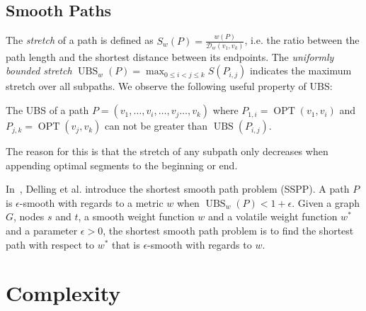 \documentclass[a4paper,UKenglish,cleveref, autoref, thm-restate]{lipics-v2021}
\newcommand*{\dist}{\mathcal{D}}
\newcommand*{\shp}{\operatorname{OPT}}
\newcommand*{\ubs}{\operatorname{UBS}}
\begin{document}
\subsection{Smooth Paths}

The \emph{stretch} of a path is defined as $S_w(P) = \frac{w(P)}{\dist_w(v_1, v_k)}$, i.e. the ratio between the path length and the shortest distance between its endpoints.
The \emph{uniformly bounded stretch} $\ubs_w(P) = \max_{0 \leq i < j \leq k}S(P_{i,j})$ indicates the maximum stretch over all subpaths.
We observe the following useful property of UBS:
\begin{observation}\label{obs:append_sp_ubs}
The UBS of a path $P = (v_1, \dots, v_i, \dots, v_j \dots, v_k)$ where $P_{1,i} = \shp(v_1, v_i)$ and $P_{j,k} = \shp(v_j, v_k)$ can not be greater than $\ubs(P_{i,j})$.
\end{observation}
The reason for this is that the stretch of any subpath only decreases when appending optimal segments to the beginning or end.

In~\cite{dss-tarrn-18}, Delling et al. introduce the shortest smooth path problem (SSPP).
A path $P$ is $\epsilon$-smooth with regards to a metric $w$ when $\ubs_w(P) < 1 + \epsilon$.
Given a graph $G$, nodes $s$ and $t$, a smooth weight function $w$ and a volatile weight function $w^*$ and a parameter $\epsilon > 0$, the shortest smooth path problem is to find the shortest path with respect to $w^*$ that is $\epsilon$-smooth with regards to $w$.

\section{Complexity}
\end{document}
